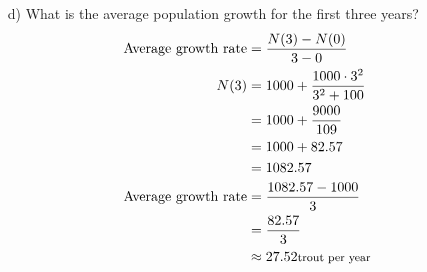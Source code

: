 \documentclass{article}
\newenvironment{solution}{\color{solutioncolor}}{}
\newcommand{\smalltext}[1]{\text{\footnotesize #1}}
\begin{document}
\begin{enumerate}
    \item[d)] What is the average population growth for the first three years?
   \begin{solution}
    \begin{align*}
        \text{Average growth rate} &= \frac{N(3) - N(0)}{3 - 0} \\
        N(3) &= 1000 + \frac{1000 \cdot 3^2}{3^2 + 100} \\
             &= 1000 + \frac{9000}{109} \\
             &= 1000 + 82.57 \\
             &= 1082.57 \\
        \text{Average growth rate} &= \frac{1082.57 - 1000}{3} \\
                                   &= \frac{82.57}{3} \\
                                   &\approx 27.52 \smalltext{ trout per year}
    \end{align*}
\end{solution} 

\end{enumerate}
\end{document}
